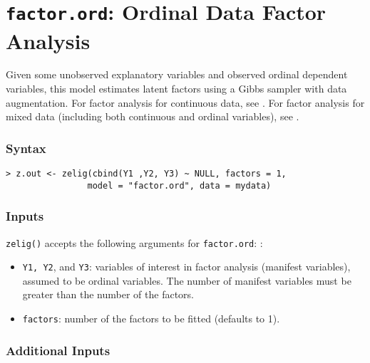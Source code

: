 \section{\texttt{factor.ord}: Ordinal Data Factor Analysis}\label{factor.ord}

Given some unobserved explanatory variables and observed ordinal
dependent variables, this model estimates latent factors using a Gibbs
sampler with data augmentation.  For factor analysis for continuous
data, see .  For factor analysis for mixed data
(including both continuous and ordinal variables), see
.

\subsubsection{Syntax}
\begin{verbatim}
> z.out <- zelig(cbind(Y1 ,Y2, Y3) ~ NULL, factors = 1, 
                model = "factor.ord", data = mydata)
\end{verbatim}

\subsubsection{Inputs}
{\tt zelig()} accepts the following arguments for {\tt factor.ord}:  :
\begin{itemize}
\item \texttt{Y1, Y2}, and \texttt{Y3}: variables of interest in
factor analysis (manifest variables), assumed to be ordinal
variables. The number of manifest variables must be greater than the
number of the factors.

\item \texttt{factors}: number of the factors to be fitted (defaults
to 1).
\end{itemize}

\subsubsection{Additional Inputs}

